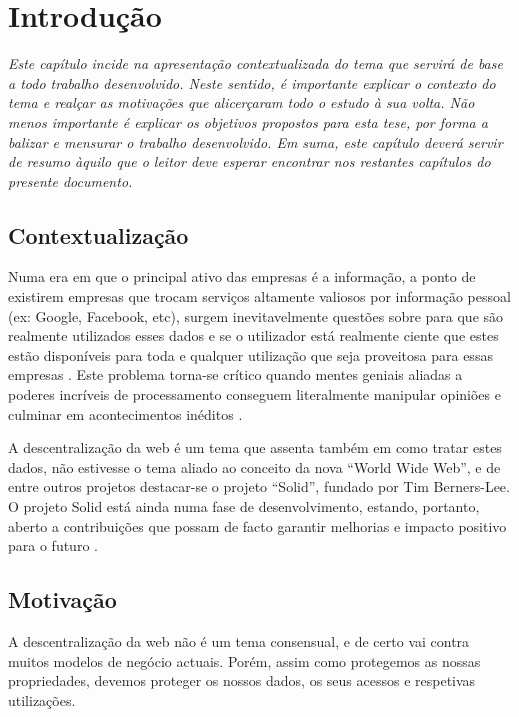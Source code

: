 \chapter{Introdução}
\label{cap:1}
\emph{Este capítulo incide na apresentação contextualizada do tema que servirá de base a todo trabalho desenvolvido. Neste sentido, é importante explicar o contexto do tema e realçar as motivações que alicerçaram todo o estudo à sua volta. Não menos importante é explicar os objetivos propostos para esta tese, por forma a balizar e mensurar o trabalho desenvolvido.
Em suma, este capítulo deverá servir de resumo àquilo que o leitor deve esperar encontrar nos restantes capítulos do presente documento.}


\section{Contextualização}
Numa era em que o principal ativo das empresas é a informação, a ponto de existirem empresas que trocam serviços altamente valiosos por informação pessoal (ex: Google, Facebook, etc)\cite{top_three_issues_centralized_web}, surgem inevitavelmente questões sobre para que são realmente utilizados esses dados e se o utilizador está realmente ciente que estes estão disponíveis para toda e qualquer utilização que seja proveitosa para essas empresas \cite{facebook_data_hell_medium}. Este problema torna-se crítico quando mentes geniais aliadas a poderes incríveis de processamento conseguem literalmente manipular opiniões e culminar em acontecimentos inéditos \cite{cambridge_analytica}.

A descentralização da web é um tema que assenta também em como tratar estes dados, não estivesse o tema aliado ao conceito da nova “World Wide Web”, e de entre outros projetos destacar-se o projeto “Solid”, fundado por Tim Berners-Lee. O projeto Solid está ainda numa fase de desenvolvimento, estando, portanto, aberto a contribuições que possam de facto garantir melhorias e impacto positivo para o futuro \cite{why_web_decentralization_future}.

\section{Motivação}
A descentralização da web não é um tema consensual, e de certo vai contra muitos modelos de negócio actuais. Porém, assim como protegemos as nossas propriedades, devemos proteger os nossos dados, os seus acessos e respetivas utilizações.

